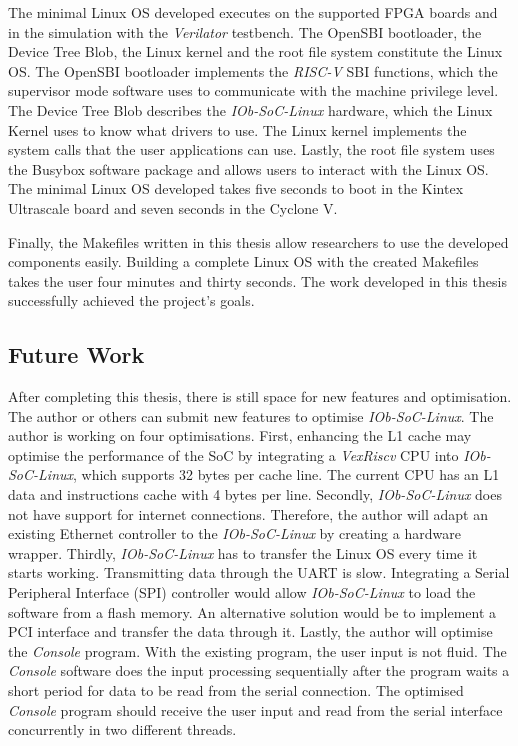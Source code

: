 The minimal Linux OS developed executes on the supported FPGA boards and in the simulation with the \textit{Verilator} testbench. The OpenSBI bootloader, the Device Tree Blob, the Linux kernel and the root file system constitute the Linux OS. The OpenSBI bootloader implements the \textit{RISC-V} SBI functions, which the supervisor mode software uses to communicate with the machine privilege level. The Device Tree Blob describes the \textit{IOb-SoC-Linux} hardware, which the Linux Kernel uses to know what drivers to use. The Linux kernel implements the system calls that the user applications can use. Lastly, the root file system uses the Busybox software package and allows users to interact with the Linux OS. The minimal Linux OS developed takes five seconds to boot in the Kintex Ultrascale board and seven seconds in the Cyclone V.

Finally, the Makefiles written in this thesis allow researchers to use the developed components easily. Building a complete Linux OS with the created Makefiles takes the user four minutes and thirty seconds. The work developed in this thesis successfully achieved the project's goals.

\subsection{Future Work}
After completing this thesis, there is still space for new features and optimisation. The author or others can submit new features to optimise \textit{IOb-SoC-Linux}. The author is working on four optimisations. First, enhancing the L1 cache may optimise the performance of the SoC by integrating a \textit{VexRiscv} CPU into \textit{IOb-SoC-Linux}, which supports 32 bytes per cache line. The current CPU has an L1 data and instructions cache with 4 bytes per line. Secondly, \textit{IOb-SoC-Linux} does not have support for internet connections. Therefore, the author will adapt an existing Ethernet controller to the \textit{IOb-SoC-Linux} by creating a hardware wrapper. Thirdly, \textit{IOb-SoC-Linux} has to transfer the Linux OS every time it starts working. Transmitting data through the UART is slow. Integrating a Serial Peripheral Interface (SPI) controller would allow \textit{IOb-SoC-Linux} to load the software from a flash memory. An alternative solution would be to implement a PCI interface and transfer the data through it. Lastly, the author will optimise the \textit{Console} program. With the existing program, the user input is not fluid. The \textit{Console} software does the input processing sequentially after the program waits a short period for data to be read from the serial connection. The optimised \textit{Console} program should receive the user input and read from the serial interface concurrently in two different threads.

